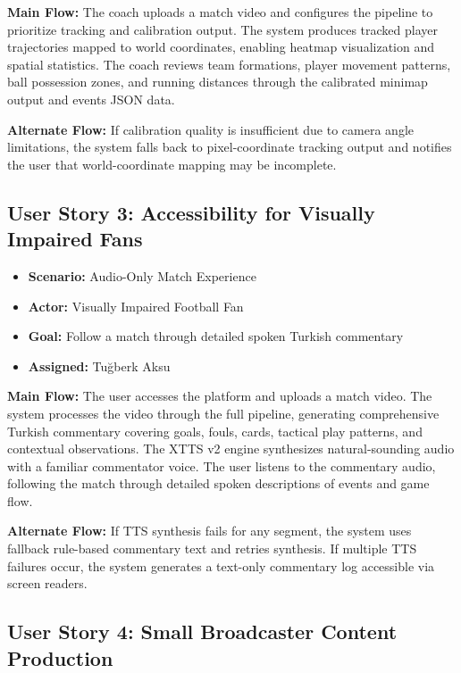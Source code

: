 \documentclass[10pt,twocolumn,a4paper]{article}
\begin{document}
\textbf{Main Flow:} The coach uploads a match video and configures the pipeline to prioritize tracking and calibration output. The system produces tracked player trajectories mapped to world coordinates, enabling heatmap visualization and spatial statistics. The coach reviews team formations, player movement patterns, ball possession zones, and running distances through the calibrated minimap output and events JSON data.

\textbf{Alternate Flow:} If calibration quality is insufficient due to camera angle limitations, the system falls back to pixel-coordinate tracking output and notifies the user that world-coordinate mapping may be incomplete.

\subsection{User Story 3: Accessibility for Visually Impaired Fans}

\begin{itemize}[noitemsep,topsep=0pt]
  \item \textbf{Scenario:} Audio-Only Match Experience
  \item \textbf{Actor:} Visually Impaired Football Fan
  \item \textbf{Goal:} Follow a match through detailed spoken Turkish commentary
  \item \textbf{Assigned:} Tu\u{g}berk Aksu
\end{itemize}

\textbf{Main Flow:} The user accesses the platform and uploads a match video. The system processes the video through the full pipeline, generating comprehensive Turkish commentary covering goals, fouls, cards, tactical play patterns, and contextual observations. The XTTS v2 engine synthesizes natural-sounding audio with a familiar commentator voice. The user listens to the commentary audio, following the match through detailed spoken descriptions of events and game flow.

\textbf{Alternate Flow:} If TTS synthesis fails for any segment, the system uses fallback rule-based commentary text and retries synthesis. If multiple TTS failures occur, the system generates a text-only commentary log accessible via screen readers.

\subsection{User Story 4: Small Broadcaster Content Production}
\end{document}
